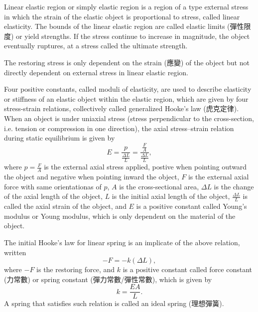 \documentclass[a4paper,12pt]{article}
\begin{document}
Linear elastic region or simply elastic region is a region of a type external stress in which the strain of the elastic object is proportional to stress, called linear elasticity. The bounds of the linear elastic region are called elastic limits (彈性限度) or yield strengths. If the stress continue to increase in magnitude, the object eventually ruptures, at a stress called the ultimate strength.

The restoring stress is only dependent on the strain (應變) of the object but not directly dependent on external stress in linear elastic region.

Four positive constants, called moduli of elasticity, are used to describe elasticity or stiffness of an elastic object within the elastic region, which are given by four stress-strain relations, collectively called generalized Hooke's law (虎克定律).
When an object is under uniaxial stress (stress perpendicular to the cross-section, i.e. tension or compression in one direction), the axial stress–strain relation during static equilibrium is given by
\[E=\frac{p}{\frac{\Delta L}{L}}=\frac{\frac{F}{A}}{\frac{\Delta L}{L}},\]
where $p=\frac{F}{A}$ is the external axial stress applied, postive when pointing outward the object and negative when pointing inward the object, $F$ is the external axial force with same orientationas of $p$, $A$ is the cross-sectional area, $\Delta L$ is the change of the axial length of the object, $L$ is the initial axial length of the object, $\frac{\Delta L}{L}$ is called the axial strain of the object, and $E$ is a positive constant called Young's modulus or Young modulus, which is only dependent on the material of the object.

The initial Hooke's law for linear spring is an implicate of the above relation, written
\[-F=-k(\Delta L),\]
where $-F$ is the restoring force, and $k$ is a positive constant called force constant (力常數) or spring constant (彈力常數/彈性常數), which is given by
\[k=\frac{EA}{L}.\]
A spring that satisfies such relation is called an ideal spring (理想彈簧).
\end{document}
